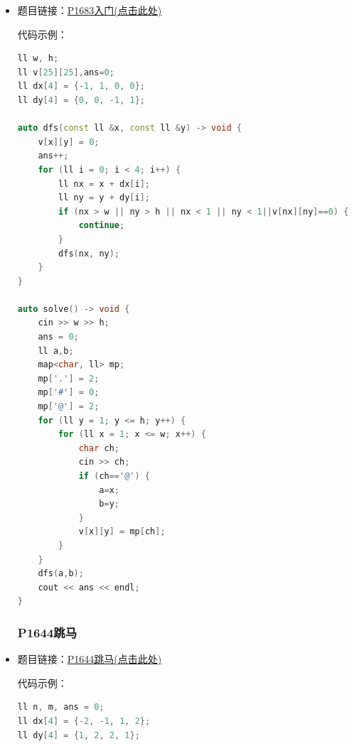 \begin{itemize}
\begin{lstlisting}[language=C++]
auto bfs(const ll &x, const ll &y) -> void {
	queue<pair<ll, ll> > q;
	g[x][y] = 0;
	q.emplace(x, y);
	while (!q.empty()) {
		const auto &[fis,snd] = q.front();
		q.pop();
		for (ll i = 0; i < 8; i++) {
			ll xx = fis + dx[i];
			ll yy = snd + dy[i];
			if (xx < 1 || yy < 1 || xx > n || yy > m || g[xx][yy] == 0) {
				continue;
			}
			q.emplace(xx, yy);
			g[xx][yy] = 0;
		}
	}
}

auto solve() -> void {
	ll cnt = 0;
	cin >> n >> m;
	map<char, ll> mp;
	mp['W'] = 1;
	mp['.'] = 0;
	for (ll i = 1; i <= n; i++) {
		for (ll j = 1; j <= m; j++) {
			char ch;
			cin >> ch;
			g[i][j] = mp[ch];
		}
	}
	for (ll i = 1; i <= n; i++) {
		for (ll j = 1; j <= m; j++) {
			//因为有标记0的步骤，所以接下来只要不是0的就是一个块的开始
			if (g[i][j] > 0) {
				cnt++;
				//dfs(i, j);
				bfs(i,j);
			}
		}
	}
	cout << cnt << endl;
}

\end{lstlisting}
\item 题目链接：\href{https://www.luogu.com.cn/problem/P1683}{P1683入门(点击此处)}

代码示例：\\
\begin{lstlisting}[language=C++]
ll w, h;
ll v[25][25],ans=0;
ll dx[4] = {-1, 1, 0, 0};
ll dy[4] = {0, 0, -1, 1};

auto dfs(const ll &x, const ll &y) -> void {
	v[x][y] = 0;
	ans++;
	for (ll i = 0; i < 4; i++) {
		ll nx = x + dx[i];
		ll ny = y + dy[i];
		if (nx > w || ny > h || nx < 1 || ny < 1||v[nx][ny]==0) {
			continue;
		}
		dfs(nx, ny);
	}
}

auto solve() -> void {
	cin >> w >> h;
	ans = 0;
	ll a,b;
	map<char, ll> mp;
	mp['.'] = 2;
	mp['#'] = 0;
	mp['@'] = 2;
	for (ll y = 1; y <= h; y++) {
		for (ll x = 1; x <= w; x++) {
			char ch;
			cin >> ch;
			if (ch=='@') {
				a=x;
				b=y;
			}
			v[x][y] = mp[ch];
		}
	}
	dfs(a,b);
	cout << ans << endl;
}
\end{lstlisting}
\subsubsection{P1644跳马}
\item 题目链接：\href{https://www.luogu.com.cn/problem/P1644}{P1644跳马(点击此处)}

代码示例：\\
\begin{lstlisting}[language=C++]
ll n, m, ans = 0;
ll dx[4] = {-2, -1, 1, 2};
ll dy[4] = {1, 2, 2, 1};


\end{lstlisting}
\end{itemize}
